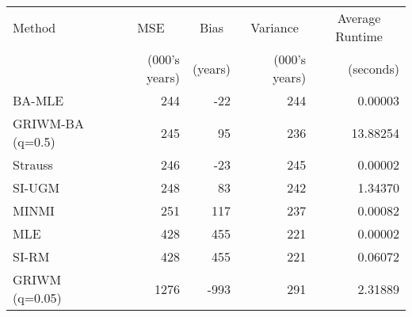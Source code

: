 
\begin{tabular}{lrrrr}
\toprule
\multicolumn{1}{l}{Method} & \multicolumn{1}{c}{MSE} & \multicolumn{1}{c}{Bias} & \multicolumn{1}{c}{Variance} & \multicolumn{1}{c}{Average Runtime} \\
 & (000's years) & (years) & (000's years) & (seconds)\\
\midrule
BA-MLE & 244 & -22 & 244 & 0.00003\\
GRIWM-BA (q=0.5) & 245 & 95 & 236 & 13.88254\\
Strauss & 246 & -23 & 245 & 0.00002\\
SI-UGM & 248 & 83 & 242 & 1.34370\\
MINMI & 251 & 117 & 237 & 0.00082\\
\addlinespace
MLE & 428 & 455 & 221 & 0.00002\\
SI-RM & 428 & 455 & 221 & 0.06072\\
GRIWM (q=0.05) & 1276 & -993 & 291 & 2.31889\\
\bottomrule
\end{tabular}
